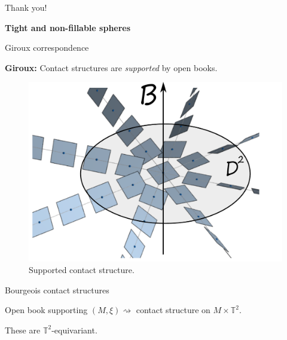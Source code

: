 \documentclass{beamer}
\begin{document}
\begin{frame}
    \centering
    Thank you!
        
\end{frame}

\begin{frame}
\begin{tcolorbox}
\Huge \begin{center}
    \textbf{Tight and non-fillable spheres}
\end{center}
\end{tcolorbox}
\end{frame}

\begin{frame}{Giroux correspondence}

\begin{tcolorbox}
\textbf{Giroux:} Contact structures are \emph{supported} by open books.
\end{tcolorbox} 

\begin{figure}
    \centering
    \includegraphics[width=0.6\linewidth]{standardctct.pdf}
    \caption{Supported contact structure.}
    \label{fig:adapted}
\end{figure}

\end{frame}

\begin{frame}{Bourgeois contact structures}
    \begin{theorem}[Bourgeois '02]
    Open book supporting $(M,\xi)\rightsquigarrow$ contact structure on $M\times \mathbb T^2$.
    \end{theorem}

 These are $\mathbb T^2$-equivariant.   
    
\end{frame}
\end{document}
